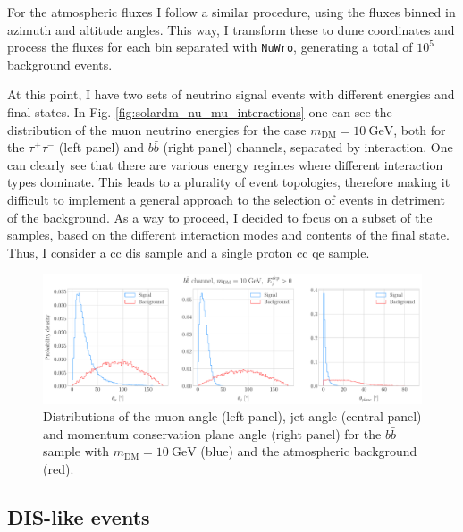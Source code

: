 For the atmospheric fluxes I follow a similar procedure, using the fluxes binned in azimuth and altitude angles. This way, I transform these to \gls{dune} coordinates and process the fluxes for each bin separated with \texttt{NuWro}, generating a total of $10^{5}$ background events.

At this point, I have two sets of neutrino signal events with different energies and final states. In Fig. \ref{fig:solardm_nu_mu_interactions} one can see the distribution of the muon neutrino energies for the case $m_{\mathrm{DM}} = 10 \ \mathrm{GeV}$, both for the $\tau^{+} \tau^{-}$ (left panel) and $b\bar{b}$ (right panel) channels, separated by interaction. One can clearly see that there are various energy regimes where different interaction types dominate. This leads to a plurality of event topologies, therefore making it difficult to implement a general approach to the selection of events in detriment of the background. As a way to proceed, I decided to focus on a subset of the samples, based on the different interaction modes and contents of the final state. Thus, I consider a \gls{cc} \gls{dis} sample and a single proton \gls{cc} \gls{qe} sample.

\begin{figure}[t]
	\centering
	\includegraphics[width=0.95\linewidth]{Images/DM_Analysis/solardm_bb_100_dis_angular_dists.pdf}
	\caption[Angular distributions for the $b\bar{b}$ \gls{dis} sample with $m_{\mathrm{DM}} = 10 \ \mathrm{GeV}$ and the atmospheric background.]{Distributions of the muon angle (left panel), jet angle (central panel) and momentum conservation plane angle (right panel) for the $b\bar{b}$ sample with $m_{\mathrm{DM}} = 10 \ \mathrm{GeV}$ (blue) and the atmospheric background (red).}
	\label{fig:solardm_bb_100_dis_angular_dists}
\end{figure}

\subsection{DIS-like events}

